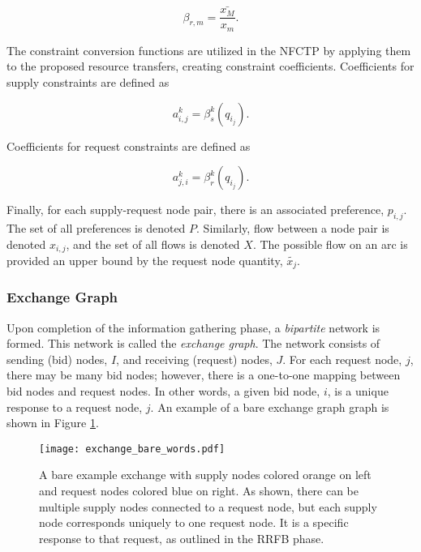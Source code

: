 \begin{equation}
  \beta_{r, m} = \frac{\bar{x_M}}{x_m}.
\end{equation}

The constraint conversion functions are utilized in the NFCTP by applying them
to the proposed resource transfers, creating constraint
coefficients. Coefficients for supply constraints are defined as

\begin{equation}
  a^k_{i, j} = \beta_s^k(q_{i_j}).
\end{equation}

\noindent
Coefficients for request constraints are defined as

\begin{equation}
  a^k_{j, i} = \beta_r^k(q_{i_j}).
\end{equation}

Finally, for each supply-request node pair, there is an associated preference,
$p_{i, j}$. The set of all preferences is denoted $P$. Similarly, flow between a
node pair is denoted $x_{i, j}$, and the set of all flows is denoted $X$. The
possible flow on an arc is provided an upper bound by the request node quantity,
$\tilde{x_j}$.

\subsubsection{Exchange Graph}

Upon completion of the information gathering phase, a \textit{bipartite} network
is formed. This network is called the \textit{exchange graph}. The network
consists of sending (bid) nodes, $I$, and receiving (request) nodes, $J$. For
each request node, $j$, there may be many bid nodes; however, there is a
one-to-one mapping between bid nodes and request nodes. In other words, a given
bid node, $i$, is a unique response to a request node, $j$. An example of a bare
exchange graph graph is shown in Figure \ref{fig:ex_bare}.

\begin{figure}
  \begin{center}
    \texttt{[image: exchange\_bare\_words.pdf]}
    \caption{A bare example exchange with supply nodes colored orange on left
      and request nodes colored blue on right. As shown, there can be multiple
      supply nodes connected to a request node, but each supply node corresponds
      uniquely to one request node. It is a specific response to that request,
      as outlined in the RRFB phase.}
    \label{fig:ex_bare}
  \end{center}
\end{figure}

